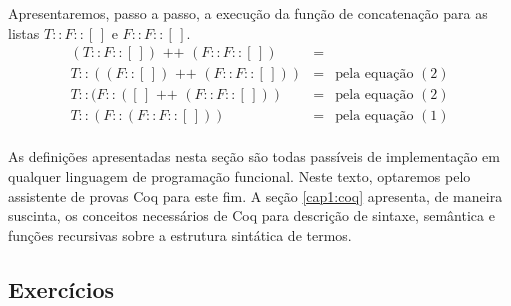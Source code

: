 \begin{Example}
Apresentaremos, passo a passo, a execu\c{c}\~ao da fun\c{c}\~ao de concatena\c{c}\~ao para as listas $T :: F :: [\,]$ e $F :: F :: [\,]$.
\[
\begin{array}{lcl}
(T :: F :: [\,]) \text{ ++ } (F :: F ::[\,]) & = & \\
T :: ((F :: [\,]) \text{ ++ } (F :: F ::[\,])) & = & \text{pela equa\c{c}\~ao }(2)\\
T :: (F :: ([\,] \text{ ++ } (F :: F ::[\,])) & = & \text{pela equa\c{c}\~ao }(2)\\
T :: (F :: (F :: F ::[\,])) & = & \text{pela equa\c{c}\~ao }(1)\\
\end{array}
\]
\end{Example}

As defini\c{c}\~oes apresentadas nesta se\c{c}\~ao s\~ao todas pass\'iveis de implementa\c{c}\~ao em qualquer linguagem de programa\c{c}\~ao
funcional. Neste texto, optaremos pelo assistente de provas Coq para este fim. A se\c{c}\~ao \ref{cap1:coq} apresenta, de maneira suscinta, 
os conceitos necess\'arios de Coq para descri\c{c}\~ao de sintaxe, sem\^antica e fun\c{c}\~oes recursivas sobre a estrutura sint\'atica de termos.

\subsection{Exerc\'icios}

